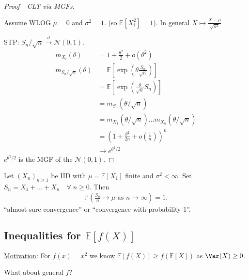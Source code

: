\begin{proof}[Proof - CLT via MGFs] ~

    Assume WLOG $\mu = 0$ and $\sigma^2 = 1$. (so $\mathbb{E}[X_i^2] = 1$). 
    In general $X \mapsto \frac{X - \mu}{\sqrt{\sigma^2}}$

    STP: $S_n / \sqrt{n} \overset{d}{\to} \mathcal{N}(0, 1)$.
    \begin{align*}
        m_{X_i}(\theta) &= 1 + \frac{\theta^2}{2} + o(\theta^2) \\
        m_{S_n / \sqrt{n}}(\theta) &= \mathbb{E}\left[\exp \left( \theta \frac{S_n}{\sqrt{n}} \right) \right] \\
        &= \mathbb{E}\left[\exp \left( \frac{\theta}{\sqrt{n}} S_n \right) \right] \\
        &= m_{S_n}(\theta / \sqrt{n}) \\
        &= m_{X_1}(\theta / \sqrt{n}) \dots m_{X_n}(\theta / \sqrt{n}) \\
        &= \left( 1 +  \frac{\theta^2}{2n} + o \left( \frac{1}{n} \right) \right)^n \\
        &\to e^{\theta^2 / 2}
    \end{align*} 
    $e^{\theta^2 / 2}$ is the MGF of the $\mathcal{N}(0, 1)$.
\end{proof} 

\begin{theorem}
    Let $(X_n)_{n \geq 1}$ be IID with $\mu = \mathbb{E}[X_1]$ finite and $\sigma^2 < \infty$. 
    Set $S_n = X_1 + \dots + X_n \quad \forall \; n \geq 0$.
    Then
    \begin{align*}
        \mathbb{P}\left( \frac{S_n}{n} \to \mu \text{ as } n \to \infty \right) = 1.
    \end{align*} 
    \color{blue} ``almost sure convergence'' or ``convergence with probability 1''.
\end{theorem} 

\subsection{Inequalities for $\mathbb{E}[f(X)]$}
\underline{Motivation}: For $f(x) = x^2$ we know $\mathbb{E}[f(X)] \geq f(\mathbb{E}[X])$ as $\Var(X) \geq 0$.

\begin{question}
    What about general $f$?
\end{question} 

